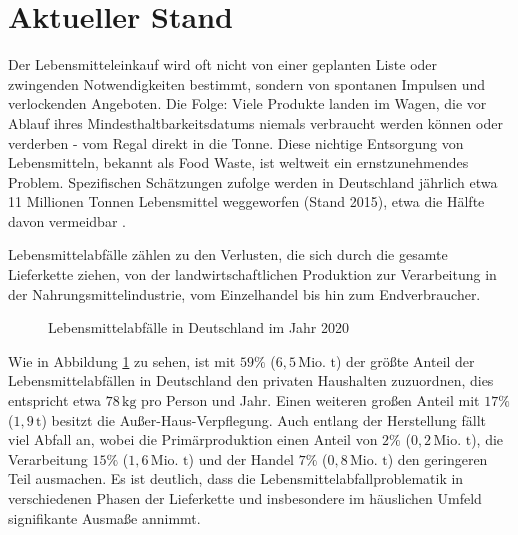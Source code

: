 \section{Aktueller Stand}
Der Lebensmitteleinkauf wird oft nicht von einer geplanten Liste oder zwingenden Notwendigkeiten bestimmt, sondern von spontanen Impulsen und verlockenden Angeboten. Die Folge: Viele Produkte landen im Wagen, die vor Ablauf ihres Mindesthaltbarkeitsdatums niemals verbraucht werden können oder verderben - vom Regal direkt in die Tonne. Diese nichtige Entsorgung von Lebensmitteln, bekannt als Food Waste, ist weltweit ein ernstzunehmendes Problem. Spezifischen Schätzungen zufolge werden in Deutschland jährlich etwa 11 Millionen Tonnen Lebensmittel weggeworfen  
(Stand 2015), etwa die Hälfte davon vermeidbar \cite{Schmidt.2019}. 

Lebensmittelabfälle zählen zu den Verlusten, die sich durch die gesamte Lieferkette ziehen, von der landwirtschaftlichen Produktion zur Verarbeitung in der Nahrungsmittelindustrie, vom Einzelhandel bis hin zum Endverbraucher. 

\begin{figure}[h]
    \centering
    \caption[Lebensmittelabfälle in Deutschland im Jahr 2020]{Lebensmittelabfälle in Deutschland im Jahr 2020 \cite{StatistischesBundesamt.2022}}
    \label{fig:AnteilAbfälle}
\end{figure}
\FloatBarrier

Wie in Abbildung \ref{fig:AnteilAbfälle} zu sehen,  ist mit $59\%$ ($6,5\,\text{Mio. t}$) der größte Anteil der Lebensmittelabfällen in Deutschland den privaten Haushalten zuzuordnen, dies entspricht etwa $78\,\text{kg}$ pro Person und Jahr. Einen weiteren großen Anteil mit $17\%$ ($1,9\,\text{t}$) besitzt die Außer-Haus-Verpflegung. Auch entlang der Herstellung fällt viel Abfall an, wobei die Primärproduktion einen Anteil von $2\%$ ($0,2\,\text{Mio. t}$), die Verarbeitung $15\%$ ($1,6\,\text{Mio. t}$) und der Handel $7\%$ ($0,8\,\text{Mio. t}$) den geringeren Teil ausmachen. Es ist deutlich, dass die Lebensmittelabfallproblematik in verschiedenen Phasen der Lieferkette und insbesondere im häuslichen Umfeld signifikante Ausmaße annimmt.


